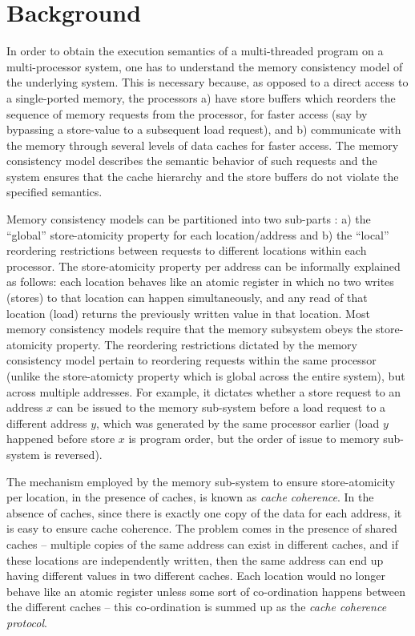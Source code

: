 \section{Background}

In order to obtain the execution semantics of a multi-threaded program on a
multi-processor system, one has to understand the memory consistency model of the
underlying system. This is necessary because, as opposed to a direct access to
a single-ported memory, the processors a) have store buffers which reorders the
sequence of memory requests from the processor, for faster access (say by bypassing
a store-value to a subsequent load request), and b) communicate with the memory
through several levels of data caches for faster access. The
memory consistency model describes the semantic behavior of such requests and
the system ensures that the cache hierarchy and the store
buffers do not violate the specified semantics.

Memory consistency models can be partitioned into two sub-parts
\cite{Arvind-memory-model}: a) the ``global'' store-atomicity property for each
location/address and b) the ``local'' reordering restrictions between requests
to different locations within each processor. The store-atomicity property per
address can be informally explained as follows: each location behaves like an
atomic register in which no two writes (stores) to that location can happen
simultaneously, and any read of that location (load) returns the previously
written value in that location. Most memory consistency models require that the
memory subsystem obeys the store-atomicity property. The reordering
restrictions dictated by the memory consistency model pertain to reordering
requests within the same processor (unlike the store-atomicty property which is
global across the entire system), but across multiple addresses. For example,
it dictates whether a store request to an address $x$ can be issued to the
memory sub-system before a load request to a different address $y$, which was
generated by the same processor earlier (\ie load $y$ happened before store $x$
is program order, but the order of issue to memory sub-system is reversed).

The mechanism employed by the memory sub-system to ensure store-atomicity per
location, in the presence of caches, is known as \emph{cache coherence}. In the
absence of caches, since there is exactly one copy of the data for each
address, it is easy to ensure cache coherence. The problem comes in the
presence of shared caches -- multiple copies of the same address can exist in
different caches, and if these locations are independently written, then the
same address can end up having different values in two different caches. Each
location would no longer behave like an atomic register unless some sort of
co-ordination happens between the different caches -- this co-ordination is
summed up as the \emph{cache coherence protocol}.

